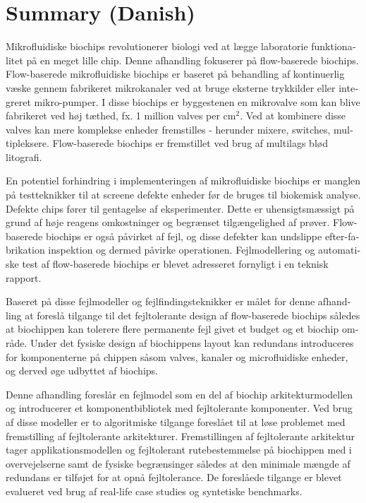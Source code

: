 \chapter{Summary (Danish)}
\begin{otherlanguage}{danish}

Mikrofluidiske biochips revolutionerer biologi ved at lægge laboratorie funktionalitet på en meget lille chip. Denne afhandling fokuserer på flow-baserede biochips. Flow-baserede mikrofluidiske biochips er baseret på behandling af kontinuerlig væske gennem fabrikeret mikrokanaler ved at bruge eksterne trykkilder eller integreret mikro-pumper. I disse biochips er byggestenen en mikrovalve som kan blive fabrikeret ved høj tæthed, fx. 1 million valves per cm$^2$. Ved at kombinere disse valves kan mere komplekse enheder fremstilles - herunder mixere, switches, multipleksere. Flow-baserede biochips er fremstillet ved brug af multilags blød litografi.

En potentiel forhindring i implementeringen af mikrofluidiske biochips er manglen på testteknikker til at screene defekte enheder før de bruges til biokemisk analyse. Defekte chips fører til gentagelse af eksperimenter. Dette er uhensigtsmæssigt på grund af høje reagens omkostninger og begrænset tilgængelighed af prøver. Flow-baserede biochips er også påvirket af fejl, og disse defekter kan undslippe efter-fabrikation inspektion og dermed påvirke operationen. Fejlmodellering og automatiske test af flow-baserede biochips er blevet adresseret fornyligt i en teknisk rapport.

Baseret på disse fejlmodeller og fejlfindingsteknikker er målet for denne afhandling at foreslå tilgange til det fejltolerante design af flow-baserede biochips således at biochippen kan tolerere flere permanente fejl givet et budget og et biochip område. Under det fysiske design af biochippens layout kan redundans introduceres for komponenterne på chippen såsom valves, kanaler og microfluidiske enheder, og derved øge udbyttet af biochips.

Denne afhandling foreslår en fejlmodel som en del af biochip arkitekturmodellen og introducerer et komponentbibliotek med fejltolerante komponenter. Ved brug af disse modeller er to algoritmiske tilgange foreslået til at løse problemet med fremstilling af fejltolerante arkitekturer. Fremstillingen af fejltolerante arkitektur tager applikationsmodellen og fejltolerant rutebestemmelse på biochippen med i overvejelserne samt de fysiske begrænsinger således at den minimale mængde af redundans er tilføjet for at opnå fejltolerance. De foreslåede tilgange er blevet evalueret ved brug af real-life case studies og syntetiske benchmarks.

\end{otherlanguage}